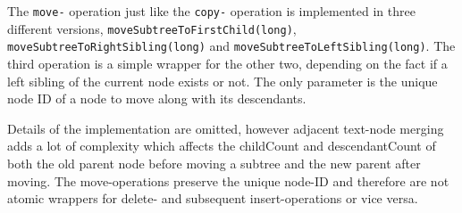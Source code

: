 The \texttt{move-} operation just like the \texttt{copy-} operation is implemented in three different versions, \texttt{moveSubtreeToFirstChild(long)}, \\\texttt{moveSubtreeToRightSibling(long)} and \texttt{moveSubtreeToLeftSibling(long)}. The third operation is a simple wrapper for the other two, depending on the fact if a left sibling of the current node exists or not. The only parameter is the unique node ID of a node to move along with its descendants.

Details of the implementation are omitted, however adjacent text-node merging adds a lot of complexity which affects the childCount and descendantCount of both the old parent node before moving a subtree and the new parent after moving. The move-operations preserve the unique node-ID and therefore are not atomic wrappers for delete- and  subsequent insert-operations or vice versa.




